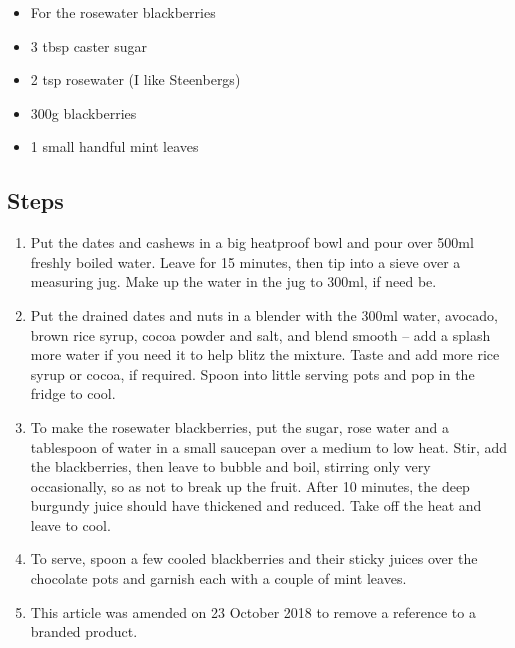\documentclass{book}
\begin{document}
\begin{itemize}
\item For the rosewater blackberries 
\item 3 tbsp caster sugar
\item 2 tsp rosewater (I like Steenbergs) 
\item 300g blackberries
\item 1 small handful mint leaves
\end{itemize}

\subsection*{Steps}
\begin{enumerate}
\item Put the dates and cashews in a big heatproof bowl and pour over 500ml freshly boiled water. Leave for 15 minutes, then tip into a sieve over a measuring jug. Make up the water in the jug to 300ml, if need be.
\item Put the drained dates and nuts in a blender with the 300ml water, avocado, brown rice syrup, cocoa powder and salt, and blend smooth – add a splash more water if you need it to help blitz the mixture. Taste and add more rice syrup or cocoa, if required. Spoon into little serving pots and pop in the fridge to cool.
\item To make the rosewater blackberries, put the sugar, rose water and a tablespoon of water in a small saucepan over a medium to low heat. Stir, add the blackberries, then leave to bubble and boil, stirring only very occasionally, so as not to break up the fruit. After 10 minutes, the deep burgundy juice should have thickened and reduced. Take off the heat and leave to cool.
\item To serve, spoon a few cooled blackberries and their sticky juices over the chocolate pots and garnish each with a couple of mint leaves.
\item  This article was amended on 23 October 2018 to remove a reference to a branded product.
\end{enumerate}
\newpage
\end{document}
